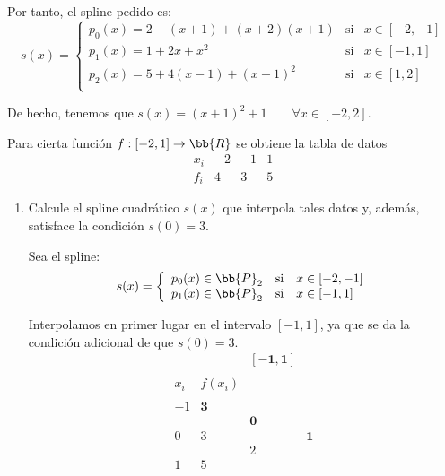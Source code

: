 \begin{ejercicio}
    Por tanto, el spline pedido es:
    \begin{equation*}
        s(x)=\left\{\begin{array}{lll}
            p_0(x)=2-(x+1)+(x+2)(x+1) & \text{si} & x\in [-2, -1] \\
            p_1(x)=1+2x+x^2 & \text{si} & x\in [-1, 1] \\
            p_{2}(x)=5+4(x-1)+(x-1)^2 & \text{si} & x\in [1,2] \\
        \end{array} \right.
    \end{equation*}

    De hecho, tenemos que $s(x)=(x+1)^2+1 \qquad \forall x\in [-2,2]$.
\end{ejercicio}

\begin{ejercicio}
    Para cierta función $f: [-2, 1] \to \bb{R}$ se obtiene la tabla de datos
    \begin{equation*}
        \begin{array}{c|ccc}
            x_i & -2 & -1 & 1 \\ \hline
            f_i & 4 & 3 & 5
        \end{array}
    \end{equation*}

    \begin{enumerate}
        \item Calcule el spline cuadrático $s(x)$ que interpola tales datos y, además, satisface la condición $s(0) = 3$.

        Sea el spline:
        \begin{equation*}
            s(x)=\left\{\begin{array}{lll}
                p_0(x)\in \bb{P}_2 & \text{si} & x\in [-2, -1]\\
                p_1(x)\in \bb{P}_2 & \text{si} & x\in [-1, 1]\\
            \end{array} \right.
        \end{equation*}

        Interpolamos en primer lugar en el intervalo $[-1,1]$, ya que se da la condición adicional de que $s(0)=3$.
        \begin{equation*}
            \begin{array}{c|ccc}
                &&\mathbf{[-1, 1]} \\ \\
                x_i & f(x_i) \\ \\
                -1 & \textbf{3} \\
                && \textbf{0} \\ 
                0 & 3 && \textbf{1}\\
                && 2\\
                1 & 5
            \end{array}
        \end{equation*}


\end{enumerate}
\end{ejercicio}
